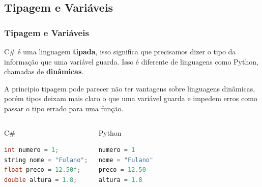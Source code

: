 \documentclass{beamer}
\begin{document}
	\subsection{Tipagem e Variáveis} %
	\begin{frame}[fragile]
		\frametitle{Tipagem e Variáveis}

		C\# é uma linguagem \textbf{tipada}, isso significa que precisamos
		dizer o tipo da informação que uma variável guarda. Isso é diferente de
		linguagens como Python, chamadas de \textbf{dinâmicas}.

		A principio tipagem pode parecer não ter vantagens sobre linguagens
		dinâmicas, porém tipos deixam mais claro o que uma variável guarda e
		impedem erros como passar o tipo errado para uma função.

		\begin{columns}
			\begin{block}{C\#}
				\begin{lstlisting}[language=Java,basicstyle=\ttfamily,keywordstyle=\color{blue}]
int numero = 1;
string nome = "Fulano";
float preco = 12.50f;
double altura = 1.8;
				\end{lstlisting}
			\end{block}
			\begin{block}{Python}
				\begin{lstlisting}[language=Python,basicstyle=\ttfamily,keywordstyle=\color{blue}]
numero = 1
nome = "Fulano"
preco = 12.50
altura = 1.8
				\end{lstlisting}
			\end{block}
		\end{columns}

	\end{frame}
\end{document}
